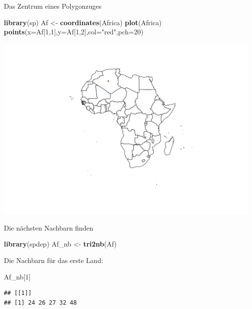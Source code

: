 \documentclass[ignorenonframetext,]{beamer}
\newenvironment{Shaded}{\begin{snugshade}}{\end{snugshade}}
\newcommand{\KeywordTok}[1]{\textcolor[rgb]{0.13,0.29,0.53}{\textbf{#1}}}
\newcommand{\DataTypeTok}[1]{\textcolor[rgb]{0.13,0.29,0.53}{#1}}
\newcommand{\DecValTok}[1]{\textcolor[rgb]{0.00,0.00,0.81}{#1}}
\newcommand{\StringTok}[1]{\textcolor[rgb]{0.31,0.60,0.02}{#1}}
\newcommand{\NormalTok}[1]{#1}
\begin{document}
\begin{frame}[fragile]{Das Zentrum eines Polygonzuges}

\begin{Shaded}
\begin{Highlighting}[]
\KeywordTok{library}\NormalTok{(sp)}
\NormalTok{Af <-}\StringTok{ }\KeywordTok{coordinates}\NormalTok{(Africa)}
\KeywordTok{plot}\NormalTok{(Africa)}
\KeywordTok{points}\NormalTok{(}\DataTypeTok{x=}\NormalTok{Af[}\DecValTok{1}\NormalTok{,}\DecValTok{1}\NormalTok{],}\DataTypeTok{y=}\NormalTok{Af[}\DecValTok{1}\NormalTok{,}\DecValTok{2}\NormalTok{],}\DataTypeTok{col=}\StringTok{"red"}\NormalTok{,}\DataTypeTok{pch=}\DecValTok{20}\NormalTok{)}
\end{Highlighting}
\end{Shaded}

\includegraphics{spdep_files/figure-beamer/unnamed-chunk-9-1.pdf}

\end{frame}

\begin{frame}[fragile]{Die nächsten Nachbarn finden}

\begin{Shaded}
\begin{Highlighting}[]
\KeywordTok{library}\NormalTok{(spdep)}
\NormalTok{Af_nb <-}\StringTok{ }\KeywordTok{tri2nb}\NormalTok{(Af)}
\end{Highlighting}
\end{Shaded}

Die Nachbarn für das erste Land:

\begin{Shaded}
\begin{Highlighting}[]
\NormalTok{Af_nb[}\DecValTok{1}\NormalTok{]}
\end{Highlighting}
\end{Shaded}

\begin{verbatim}
## [[1]]
## [1] 24 26 27 32 48
\end{verbatim}

\end{frame}
\end{document}
